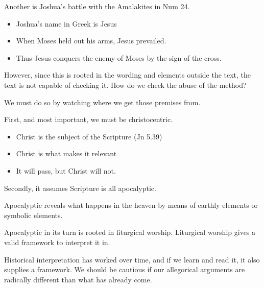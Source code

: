 \documentclass{beamer}
\begin{document}
\begin{frame}
  Another is Joshua's battle with the Amalakites in Num 24.\pause
  \begin{itemize}
	\item Joshua's name in Greek is Jesus\pause
	\item When Moses held out his arms, Jesus prevailed.\pause
	\item Thus Jesus conquers the enemy of Moses by the sign of the cross.
  \end{itemize}
\end{frame}

\begin{frame}
  However, since this is rooted in the wording and elements outside the text, the text is not capable of checking it.
  How do we check the abuse of the method?
\end{frame}

\begin{frame}
  We must do so by watching where we get those premises from.
\end{frame}

\begin{frame}
  First, and most important, we must be christocentric.\pause
  \begin{itemize}
	\item Christ is the subject of the Scripture (Jn 5.39)\pause
	\item Christ is what makes it relevant\pause
	\item It will pass, but Christ will not.
  \end{itemize}
\end{frame}

\begin{frame}
  Secondly, it assumes Scripture is all apocalyptic.\pause
\end{frame}

\begin{frame}
  Apocalyptic reveals what happens in the heaven by means of earthly elements or symbolic elements.
\end{frame}

\begin{frame}
  Apocalyptic in its turn is rooted in liturgical worship.
  Liturgical worship gives a valid framework to interpret it in.
\end{frame}

\begin{frame}
  Historical interpretation has worked over time, and if we learn and read it, it also supplies a framework.
  We should be cautious if our allegorical arguments are radically different than what has already come.
\end{frame}
\end{document}
